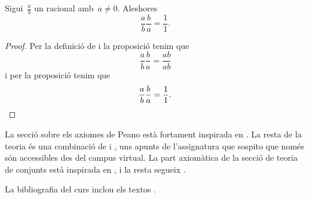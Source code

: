 \documentclass[../../main.tex]{subfiles}
\begin{document}
    \begin{theorem}
        \label{thm:Q és un cos}
        Sigui~\(\frac{a}{b}\) un racional amb~\(a\neq0\).
        Aleshores
        \[
            \frac{a}{b}\frac{b}{a}=\frac{1}{1}.
        \]
        \begin{proof}
            Per la definició de  i la proposició  tenim que
            \[
                \frac{a}{b}\frac{b}{a}=\frac{ab}{ab}
            \]
            i per la proposició  tenim que
            \[
                \frac{a}{b}\frac{b}{a}=\frac{1}{1}.\qedhere
            \]
        \end{proof}
    \end{theorem}
    \printbibliography
    La secció sobre els axiomes de Peano està fortament inspirada en \cite{notesKumar}.
    La resta de la teoria és una combinació de \cite{AntoineRosaCampsMoncasiIntroduccioAlgebraAbstracta} i \cite{TemesFonaments}, uns apunts de l'assignatura que sospito que només són accessibles des del campus virtual.
    La part axiomàtica de la secció de teoria de conjunts està inspirada en \cite{ACTEAguade}, i la resta segueix \cite{TemesFonaments}.

    La bibliografia del curs inclou els textos \cite{AntoineRosaCampsMoncasiIntroduccioAlgebraAbstracta, CastelletLlerenaAlgebraLinealIGeometria, GodementAlgebra, NutsAndBoltsOfProofs, BujalanceBujalanceCostaProblemasMatematicaDiscreta, IntroductionToMathematicalReasoning, ChapterZeroSchumacher}.
\end{document}
